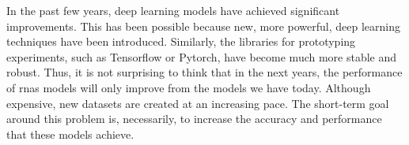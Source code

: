 

In the past few years, deep learning models have achieved
significant improvements. This has been possible because
new, more powerful, deep learning techniques have been
introduced. Similarly, the libraries for prototyping
experiments, such as Tensorflow or Pytorch, have become much
more stable and robust. Thus, it is not surprising to think
that in the next years, the performance of \glspl{rna}
models will only improve from the models we have today.
Although expensive, new datasets are created at an
increasing pace. The short-term goal around this problem is,
necessarily, to increase the accuracy and performance that
these models achieve.
